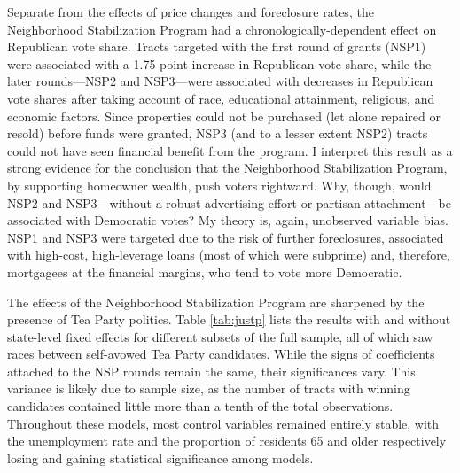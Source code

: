 \documentclass[
]{article}
\begin{document}
Separate from the effects of price changes and foreclosure rates, the Neighborhood Stabilization Program had a chronologically-dependent effect on Republican vote share.
Tracts targeted with the first round of grants (NSP1) were associated with a 1.75-point increase in Republican vote share, while the later rounds---NSP2 and NSP3---were associated with decreases in Republican vote shares after taking account of race, educational attainment, religious, and economic factors.
Since properties could not be purchased (let alone repaired or resold) before funds were granted, NSP3 (and to a lesser extent NSP2) tracts could not have seen financial benefit from the program.
I interpret this result as a strong evidence for the conclusion that the Neighborhood Stabilization Program, by supporting homeowner wealth, push voters rightward.
Why, though, would NSP2 and NSP3---without a robust advertising effort or partisan attachment---be associated with Democratic votes?
My theory is, again, unobserved variable bias.
NSP1 and NSP3 were targeted due to the risk of further foreclosures, associated with high-cost, high-leverage loans (most of which were subprime) and, therefore, mortgagees at the financial margins, who tend to vote more Democratic.

The effects of the Neighborhood Stabilization Program are sharpened by the presence of Tea Party politics.
Table \ref{tab:justp} lists the results with and without state-level fixed effects for different subsets of the full sample, all of which saw races between self-avowed Tea Party candidates.
While the signs of coefficients attached to the NSP rounds remain the same, their significances vary.
This variance is likely due to sample size, as the number of tracts with winning candidates contained little more than a tenth of the total observations.
Throughout these models, most control variables remained entirely stable, with the unemployment rate and the proportion of residents 65 and older respectively losing and gaining statistical significance among models.
\end{document}
